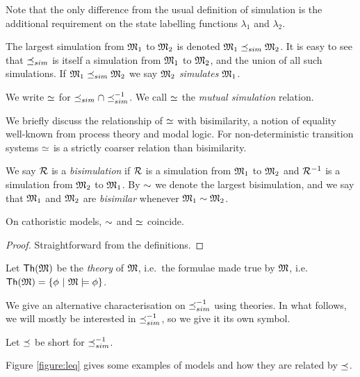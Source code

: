 \NI Note that the only difference from the usual definition of
simulation is the additional requirement on the state labelling
functions $\lambda_1$ and $\lambda_2$.

\begin{definition}
The largest simulation from $\frak{M}_1$ to $\frak{M}_2$ is denoted $\frak{M}_1
\preceq_{sim} \frak{M}_2$.  It is easy to see that $\preceq_{sim}$ is itself a
simulation from $\frak{M}_1$ to $\frak{M}_2$, and the union of all such
simulations.  If $\frak{M}_1 \preceq_{sim} \frak{M}_2$ we say $\frak{M}_2$
\emph{simulates} $\frak{M}_1$.

We write $\simeq$ for $\preceq_{sim} \cap \preceq_{sim}^{-1}$. We call $\simeq$ the
\emph{mutual simulation} relation.
\end{definition}

\NI We briefly discuss the relationship of $\simeq$ with
bisimilarity, a notion of equality well-known from process theory and
modal logic. For non-deterministic transition systems $\simeq$ is a
strictly coarser relation than bisimilarity.

\begin{definition}
We say $\mathcal{R}$ is a \emph{bisimulation} if $\mathcal{R}$ is a simulation from
$\frak{M}_1$ to $\frak{M}_2$ and $\mathcal{R}^{-1}$ is a simulation from $\frak{M}_2$ to
$\frak{M}_1$. By $\sim$ we denote the largest bisimulation, and we say
that $\frak{M}_1$ and $\frak{M}_2$ are \emph{bisimilar} whenever $\frak{M}_1
\sim \frak{M}_2$.
\end{definition}

\begin{lemma}
On cathoristic models, $\sim$ and $\simeq$ coincide.
\end{lemma}
\begin{proof}
Straightforward from the definitions.
\end{proof}

\begin{definition}
Let $\mathsf{Th}(\frak{M})$ be the \emph{theory} of $\frak{M}$, i.e.~the formulae
made true by $\frak{M}$, i.e.~$\mathsf{Th}(\frak{M}) = \{\phi\ |\ \frak{M} \models
\phi \}$.
\end{definition}

\NI We give an alternative characterisation on $\preceq_{sim}^{-1}$ using
theories. In what follows, we will mostly be interested in
$\preceq_{sim}^{-1}$, so we give it its own symbol.

\begin{definition}
Let $\preceq$  be short for $\preceq_{sim}^{-1}$. 
\end{definition}

\NI Figure \ref{figure:leq} gives some examples of models and how they
are related by $\preceq$.

